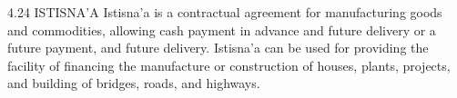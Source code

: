 4.24 ISTISNA'A
Istisna'a is a contractual agreement for manufacturing goods and commodities, allowing cash payment in advance and future delivery or a future payment, and future delivery. Istisna’a can be used for providing the facility of financing the manufacture or construction of houses, plants, projects, and building of bridges, roads, and highways.
 

